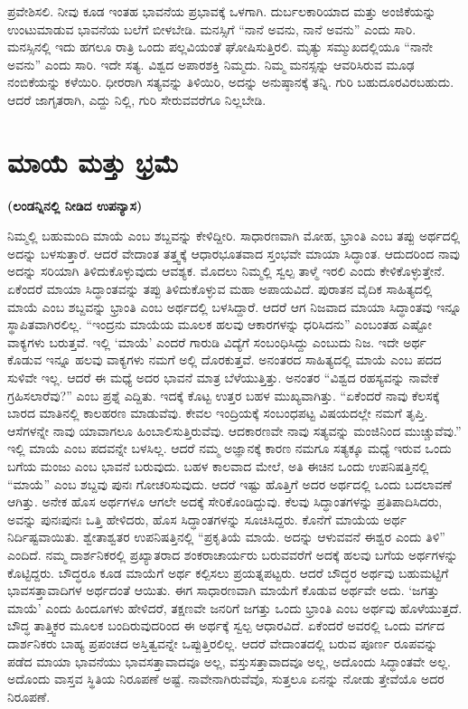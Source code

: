 ಪ್ರವೇಶಿಸಲಿ. ನೀವು ಕೂಡ ಇಂತಹ ಭಾವನೆಯ ಪ್ರಭಾವಕ್ಕೆ ಒಳಗಾಗಿ. ದುರ್ಬಲಕಾರಿಯಾದ ಮತ್ತು ಅಂಜಿಕೆಯನ್ನು ಉಂಟುಮಾಡುವ ಭಾವನೆಯ ಬಲೆಗೆ ಬೀಳಬೇಡಿ. ಮನಸ್ಸಿಗೆ “ನಾನೆ ಅವನು, ನಾನೆ ಅವನು” ಎಂದು ಸಾರಿ. ಮನಸ್ಸಿನಲ್ಲಿ ಇದು ಹಗಲೂ ರಾತ್ರಿ ಒಂದು ಪಲ್ಲವಿಯಂತೆ ಘೋಷಿಸುತ್ತಿರಲಿ. ಮೃತ್ಯು ಸಮ್ಮುಖದಲ್ಲಿಯೂ “ನಾನೇ ಅವನು” ಎಂದು ಸಾರಿ. ಇದೇ ಸತ್ಯ. ವಿಶ್ವದ ಅಪಾರಶಕ್ತಿ ನಿಮ್ಮದು. ನಿಮ್ಮ ಮನಸ್ಸನ್ನು ಆವರಿಸಿರುವ ಮೂಢ ನಂಬಿಕೆಯನ್ನು ಕಳೆಯಿರಿ. ಧೀರರಾಗಿ ಸತ್ಯವನ್ನು ತಿಳಿಯಿರಿ, ಅದನ್ನು ಅನುಷ್ಠಾನಕ್ಕೆ ತನ್ನಿ. ಗುರಿ ಬಹುದೂರವಿರಬಹುದು. ಆದರೆ ಜಾಗೃತರಾಗಿ, ಎದ್ದು ನಿಲ್ಲಿ, ಗುರಿ ಸೇರುವವರೆಗೂ ನಿಲ್ಲಬೇಡಿ.

\chapter{ಮಾಯೆ ಮತ್ತು ಭ್ರಮೆ}

\centerline{\textbf{(ಲಂಡನ್ನಿನಲ್ಲಿ ನೀಡಿದ ಉಪನ್ಯಾಸ)}}

ನಿಮ್ಮಲ್ಲಿ ಬಹುಮಂದಿ ಮಾಯೆ ಎಂಬ ಶಬ್ದವನ್ನು ಕೇಳಿದ್ದೀರಿ. ಸಾಧಾರಣವಾಗಿ ಮೋಹ, ಭ್ರಾಂತಿ ಎಂಬ ತಪ್ಪು ಅರ್ಥದಲ್ಲಿ ಅದನ್ನು ಬಳಸುತ್ತಾರೆ. ಆದರೆ ವೇದಾಂತ ತತ್ತ್ವಕ್ಕೆ ಆಧಾರಭೂತವಾದ ಸ್ತಂಭವೇ ಮಾಯಾ ಸಿದ್ಧಾಂತ. ಆದುದರಿಂದ ನಾವು ಅದನ್ನು ಸರಿಯಾಗಿ ತಿಳಿದುಕೊಳ್ಳುವುದು ಆವಶ್ಯಕ. ಮೊದಲು ನಿಮ್ಮಲ್ಲಿ ಸ್ವಲ್ಪ ತಾಳ್ಮೆ ಇರಲಿ ಎಂದು ಕೇಳಿಕೊಳ್ಳುತ್ತೇನೆ. ಏಕೆಂದರೆ ಮಾಯಾ ಸಿದ್ಧಾಂತವನ್ನು ತಪ್ಪು ತಿಳಿದುಕೊಳ್ಳುವ ಮಹಾ ಅಪಾಯವಿದೆ. ಪುರಾತನ ವೈದಿಕ ಸಾಹಿತ್ಯದಲ್ಲಿ ಮಾಯೆ ಎಂಬ ಶಬ್ದವನ್ನು ಭ್ರಾಂತಿ ಎಂಬ ಅರ್ಥದಲ್ಲಿ ಬಳಸಿದ್ದಾರೆ. ಆದರೆ ಆಗ ನಿಜವಾದ ಮಾಯಾ ಸಿದ್ಧಾಂತವು ಇನ್ನೂ ಸ್ಥಾಪಿತವಾಗಿರಲಿಲ್ಲ. “ಇಂದ್ರನು ಮಾಯೆಯ ಮೂಲಕ ಹಲವು ಆಕಾರಗಳನ್ನು ಧರಿಸಿದನು” ಎಂಬಂತಹ ಎಷ್ಟೋ ವಾಕ್ಯಗಳು ಬರುತ್ತವೆ. ಇಲ್ಲಿ ‘ಮಾಯೆ’ ಎಂದರೆ ಗಾರುಡಿ ವಿದ್ಯೆಗೆ ಸಂಬಂಧಿಸಿದ್ದು ಎಂಬುದು ನಿಜ. ಇದೇ ಅರ್ಥ ಕೊಡುವ ಇನ್ನೂ ಹಲವು ವಾಕ್ಯಗಳು ನಮಗೆ ಅಲ್ಲಿ ದೊರಕುತ್ತವೆ. ಅನಂತರದ ಸಾಹಿತ್ಯದಲ್ಲಿ ಮಾಯೆ ಎಂಬ ಪದದ ಸುಳಿವೇ ಇಲ್ಲ. ಆದರೆ ಈ ಮಧ್ಯೆ ಅದರ ಭಾವನೆ ಮಾತ್ರ ಬೆಳೆಯುತ್ತಿತ್ತು. ಅನಂತರ “ವಿಶ್ವದ ರಹಸ್ಯವನ್ನು ನಾವೇಕೆ ಗ್ರಹಿಸಲಾರೆವು?” ಎಂಬ ಪ್ರಶ್ನೆ ಎದ್ದಿತು. ಇದಕ್ಕೆ ಕೊಟ್ಟ ಉತ್ತರ ಬಹಳ ಮುಖ್ಯವಾಗಿತ್ತು. “ಏಕೆಂದರೆ ನಾವು ಕೆಲಸಕ್ಕೆ ಬಾರದ ಮಾತಿನಲ್ಲಿ ಕಾಲಹರಣ ಮಾಡುವೆವು. ಕೇವಲ ಇಂದ್ರಿಯಕ್ಕೆ ಸಂಬಂಧಪಟ್ಟ ವಿಷಯದಲ್ಲೇ ನಮಗೆ ತೃಪ್ತಿ. ಆಸೆಗಳನ್ನೇ ನಾವು ಯಾವಾಗಲೂ ಹಿಂಬಾಲಿಸುತ್ತಿರುವೆವು. ಆದಕಾರಣವೇ ನಾವು ಸತ್ಯವನ್ನು ಮಂಜಿನಿಂದ ಮುಚ್ಚುವೆವು.” ಇಲ್ಲಿ ಮಾಯೆ ಎಂಬ ಪದವನ್ನೇ ಬಳಸಿಲ್ಲ. ಆದರೆ ನಮ್ಮ ಅಜ್ಞಾನಕ್ಕೆ ಕಾರಣ ನಮಗೂ ಸತ್ಯಕ್ಕೂ ಮಧ್ಯೆ ಇರುವ ಒಂದು ಬಗೆಯ ಮಂಜು ಎಂಬ ಭಾವನೆ ಬರುವುದು. ಬಹಳ ಕಾಲವಾದ ಮೇಲೆ, ಅತಿ ಈಚಿನ ಒಂದು ಉಪನಿಷತ್ತಿನಲ್ಲಿ “ಮಾಯೆ” ಎಂಬ ಶಬ್ದವು ಪುನಃ ಗೋಚರಿಸುವುದು. ಆದರೆ ಇಷ್ಟು ಹೊತ್ತಿಗೆ ಅದರ ಅರ್ಥದಲ್ಲಿ ಒಂದು ಬದಲಾವಣೆ ಆಗಿತ್ತು. ಅನೇಕ ಹೊಸ ಅರ್ಥಗಳೂ ಆಗಲೇ ಅದಕ್ಕೆ ಸೇರಿಕೊಂಡಿದ್ದುವು. ಕೆಲವು ಸಿದ್ಧಾಂತಗಳನ್ನು ಪ್ರತಿಪಾದಿಸಿದರು, ಅವನ್ನು ಪುನಃಪುನಃ ಒತ್ತಿ ಹೇಳಿದರು, ಹೊಸ ಸಿದ್ಧಾಂತಗಳನ್ನು ಸೂಚಿಸಿದ್ದರು. ಕೊನೆಗೆ ಮಾಯೆಯ ಅರ್ಥ ನಿರ್ದಿಷ್ಟವಾಯಿತು. ಶ್ವೇತಾಶ್ವತರ ಉಪನಿಷತ್ತಿನಲ್ಲಿ “ಪ್ರಕೃತಿಯೆ ಮಾಯೆ. ಅದನ್ನು ಆಳುವವನೆ ಈಶ್ವರ ಎಂದು ತಿಳಿ” ಎಂದಿದೆ. ನಮ್ಮ ದಾರ್ಶನಿಕರಲ್ಲಿ ಪ್ರಖ್ಯಾತರಾದ ಶಂಕರಾಚಾರ್ಯರು ಬರುವವರೆಗೆ ಅದಕ್ಕೆ ಹಲವು ಬಗೆಯ ಅರ್ಥಗಳನ್ನು ಕೊಟ್ಟಿದ್ದರು. ಬೌದ್ಧರೂ ಕೂಡ ಮಾಯೆಗೆ ಅರ್ಥ ಕಲ್ಪಿಸಲು ಪ್ರಯತ್ನಪಟ್ಟರು. ಆದರೆ ಬೌದ್ಧರ ಅರ್ಥವು ಬಹುಮಟ್ಟಿಗೆ ಭಾವಸತ್ತಾವಾದಿಗಳ ಅರ್ಥದಂತೆ ಆಯಿತು. ಈಗ ಸಾಧಾರಣವಾಗಿ ಮಾಯೆಗೆ ಕೊಡುವ ಅರ್ಥವೇ ಅದು. ‘ಜಗತ್ತು ಮಾಯೆ’ ಎಂದು ಹಿಂದೂಗಳು ಹೇಳಿದರೆ, ತಕ್ಷಣವೇ ಜನರಿಗೆ ಜಗತ್ತು ಒಂದು ಭ್ರಾಂತಿ ಎಂಬ ಅರ್ಥವು ಹೊಳೆಯುತ್ತದೆ. ಬೌದ್ಧ ತಾತ್ತ್ವಿಕರ ಮೂಲಕ ಬಂದಿರುವುದರಿಂದ ಈ ಅರ್ಥಕ್ಕೆ ಸ್ವಲ್ಪ ಆಧಾರವಿದೆ. ಏಕೆಂದರೆ ಅವರಲ್ಲಿ ಒಂದು ವರ್ಗದ ದಾರ್ಶನಿಕರು ಬಾಹ್ಯ ಪ್ರಪಂಚದ ಅಸ್ತಿತ್ವವನ್ನೇ ಒಪ್ಪುತ್ತಿರಲಿಲ್ಲ. ಆದರೆ ವೇದಾಂತದಲ್ಲಿ ಬರುವ ಪೂರ್ಣ ರೂಪವನ್ನು ಪಡೆದ ಮಾಯಾ ಭಾವನೆಯು ಭಾವಸತ್ತಾವಾದವೂ ಅಲ್ಲ, ವಸ್ತುಸತ್ತಾವಾದವೂ ಅಲ್ಲ, ಅದೊಂದು ಸಿದ್ಧಾಂತವೇ ಅಲ್ಲ. ಅದೊಂದು ವಾಸ್ತವ ಸ್ಥಿತಿಯ ನಿರೂಪಣೆ ಅಷ್ಟೆ. ನಾವೇನಾಗಿರುವೆವೊ, ಸುತ್ತಲೂ ಏನನ್ನು ನೋಡು ತ್ತೇವೆಯೊ ಅದರ ನಿರೂಪಣೆ.


